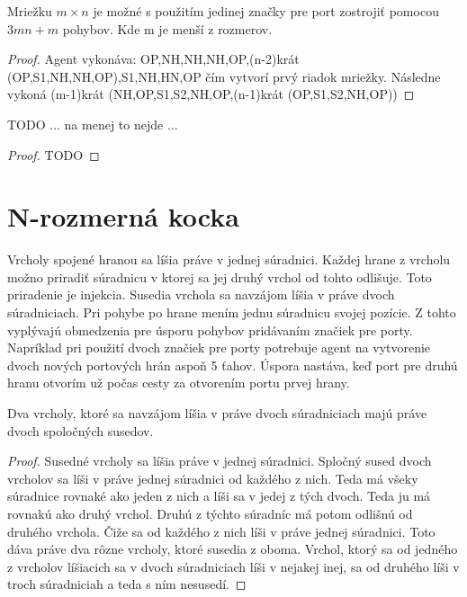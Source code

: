 \begin{lem}
Mriežku $m \times n$ je možné s použitím jedinej značky pre port zostrojiť
pomocou $3mn + m$ pohybov. Kde m je menší z rozmerov.
\end{lem}
\begin{proof}
Agent vykonáva: OP,NH,NH,NH,OP,(n-2)krát (OP,S1,NH,NH,OP),S1,NH,HN,OP čím
vytvorí prvý riadok mriežky. Následne vykoná
(m-1)krát (NH,OP,S1,S2,NH,OP,(n-1)krát (OP,S1,S2,NH,OP))
\end{proof}
\begin{lem}
TODO ... na menej to nejde ...
\end{lem}
\begin{proof}
TODO
\end{proof}




\section{N-rozmerná kocka}
Vrcholy spojené hranou sa líšia práve v jednej súradnici. Každej hrane z
vrcholu možno priradiť súradnicu v ktorej sa jej druhý vrchol od tohto
odlišuje. Toto priradenie je injekcia.
Susedia vrchola sa navzájom líšia v práve dvoch súradniciach. Pri pohybe po
hrane mením jednu súradnicu svojej pozície. Z tohto vyplývajú obmedzenia
pre úsporu pohybov pridávaním značiek pre porty. Napríklad pri použití dvoch
značiek pre porty potrebuje agent na vytvorenie dvoch nových portových hrán
aspoň 5 ťahov. Úspora nastáva, keď port pre druhú hranu otvorím už počas
cesty za otvorením portu prvej hrany.

\begin{lem}
Dva vrcholy, ktoré sa navzájom líšia v práve dvoch súradniciach majú práve dvoch
spoločných susedov.
\end{lem}
\begin{proof}
Susedné vrcholy sa líšia práve v jednej súradnici. Spločný sused dvoch
vrcholov sa líši v práve jednej súradnici od každého z nich. Teda má všeky
súradnice rovnaké ako jeden z nich a líši sa v jedej z tých dvoch. Teda ju
má rovnakú ako druhý vrchol. Druhú z týchto súradníc má potom odlišnú od
druhého vrchola. Čiže sa od každého z nich líši v práve jednej súradnici.
Toto dáva práve dva rôzne vrcholy, ktoré susedia z oboma. Vrchol, ktorý
sa od jedného z vrcholov líšiacich sa v dvoch súradniciach líši v nejakej
inej, sa od druhého líši v troch súradniciah a teda s ním nesusedí.
\end{proof}

